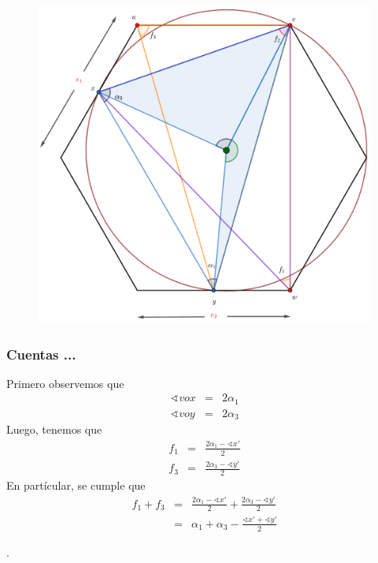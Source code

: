 {\begin{frame}
  \begin{figure}
    \centering
    \includegraphics[width=.65 \paperwidth]{./images/Bosquejo10.png}
  \end{figure}
\end{frame} 

\begin{frame}
  \frametitle{Cuentas ...}
  Primero observemos que
  \begin{eqnarray*}
    \sphericalangle vox &=& 2 \alpha_1\\
    \sphericalangle voy &=& 2 \alpha_3
  \end{eqnarray*}
  Luego, tenemos que
 \begin{eqnarray*}
    f_1 &=& \frac{2\alpha_1 - \sphericalangle x'}{2}\\
    f_3 &=& \frac{2\alpha_3 - \sphericalangle y'}{2}
  \end{eqnarray*}
 En partícular, se cumple que
 \begin{eqnarray*}
    f_1 + f_3 &=& \frac{2\alpha_1 - \sphericalangle x'}{2} +  \frac{2\alpha_3 - \sphericalangle y'}{2}\\
              &=& \alpha_1 + \alpha_3 - \frac{\sphericalangle x' + \sphericalangle y'}{2}
 \end{eqnarray*}

 .\newline


\end{frame}}
